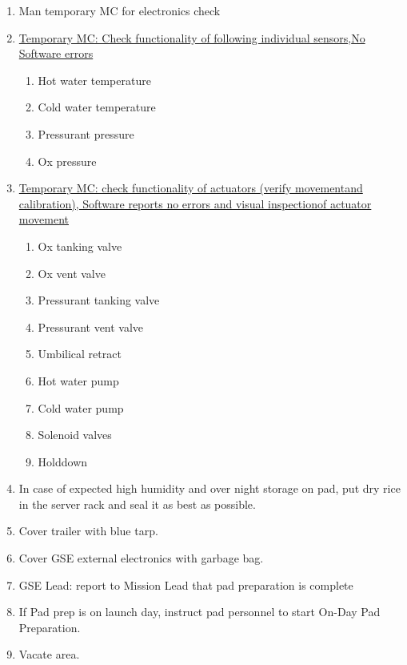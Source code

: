 \begin{enumerate}[label=PP\arabic*.]
    \item Man temporary MC for electronics check \checkbox
    \item \label{pad_start} \underline{Temporary MC: Check functionality of following individual sensors},\newline\underline{No Software errors}
        \begin{enumerate}[label*=\arabic*.]
            \item Hot water temperature \leftcheckbox
            \item Cold water temperature \leftcheckbox
            \item Pressurant pressure \leftcheckbox
            \item Ox pressure \leftcheckbox
        \end{enumerate}
    \item \underline{Temporary MC:
    check functionality of actuators (verify movement}\newline\underline{and calibration), Software reports no errors and visual inspection}\newline\underline{of actuator movement}
        \begin{enumerate}[label*=\arabic*.]
            \item Ox tanking valve \leftcheckbox
            \item Ox vent valve \leftcheckbox
            \item Pressurant tanking valve \leftcheckbox
            \item Pressurant vent valve \leftcheckbox
            \item Umbilical retract \leftcheckbox
            \item Hot water pump \leftcheckbox
            \item Cold water pump \leftcheckbox
            \item Solenoid valves \leftcheckbox
            \item Holddown \leftcheckbox
        \end{enumerate}
        
    
    \item In case of expected high humidity and over night storage on pad, put dry rice in the server rack and seal it as best as possible.\checkbox
    
    \item Cover trailer with blue tarp.\checkbox
    \item Cover GSE external electronics with garbage bag.\checkbox
    \item GSE Lead: report to Mission Lead that pad preparation is complete\checkbox
    \item If Pad prep is on launch day, instruct pad personnel to start On-Day Pad Preparation.\checkbox
    \item \label{pad_prep_end} Vacate area.\checkbox

\end{enumerate}
